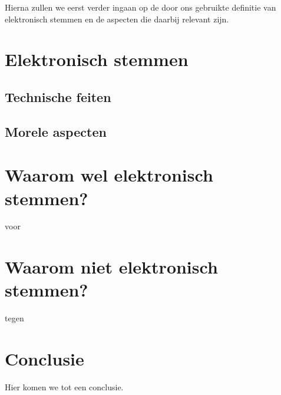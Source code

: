 \documentclass[a4paper]{article}
\begin{document}
Hierna zullen we eerst verder ingaan op de door ons gebruikte definitie van elektronisch stemmen en de aspecten die daarbij relevant zijn.

\section{Elektronisch stemmen}

\subsection{Technische feiten}

\subsection{Morele aspecten}


\section{Waarom wel elektronisch stemmen?}

voor

\section{Waarom niet elektronisch stemmen?}

tegen


\section{Conclusie}

Hier komen we tot een conclusie.

\newpage


\renewcommand\refname{Literatuur}

\end{document}
